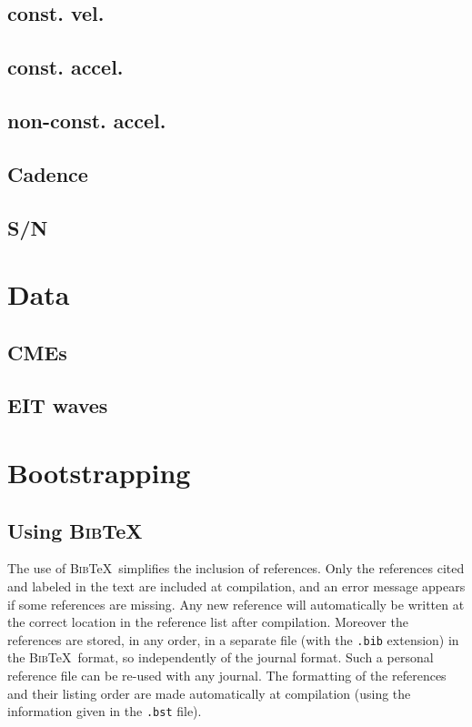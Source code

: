 \documentclass[namedreferences]{SolarPhysics}
\newcommand{\BibTeX}{\textsc{Bib}\TeX}
\begin{document}
\begin{article}
\subsection{const. vel.}

\subsection{const. accel.}

\subsection{non-const. accel.}

\subsection{ Cadence}

\subsection{S/N}

\section{Data}

\subsection{CMEs}

\subsection{EIT waves}

\section{Bootstrapping}

      
\subsection{Using \BibTeX} %
  \label{S-BibTeX}
  The use of \BibTeX\ simplifies the inclusion of references. Only the 
references cited and labeled in the text are included at compilation, 
and an error message appears if some references
are missing.  Any new reference will automatically be written at the correct 
location in the reference list after compilation. 
Moreover the references are stored, in any order, in a separate file
(with the \texttt{.bib} extension) in the \BibTeX\ format, so independently of 
the journal format. Such a personal reference file can be re-used with any journal.
The formatting of the references and their listing order are made automatically
at compilation (using the information given in the \texttt{.bst} file). 
        

\end{article}
\end{document}
